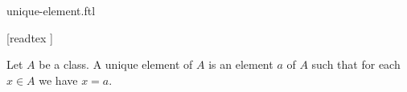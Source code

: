 \documentclass{stex}
\begin{document}
\begin{smodule}{unique-element.ftl}

  \begin{forthel}

    [readtex ]
  \end{forthel}

  \begin{forthel}
    \begin{definition}
      Let $A$ be a class.
      A unique element of $A$ is an element $a$ of $A$ such that for each $x \in A$ we have $x = a$.
    \end{definition}
  \end{forthel}
\end{smodule}
\end{document}
